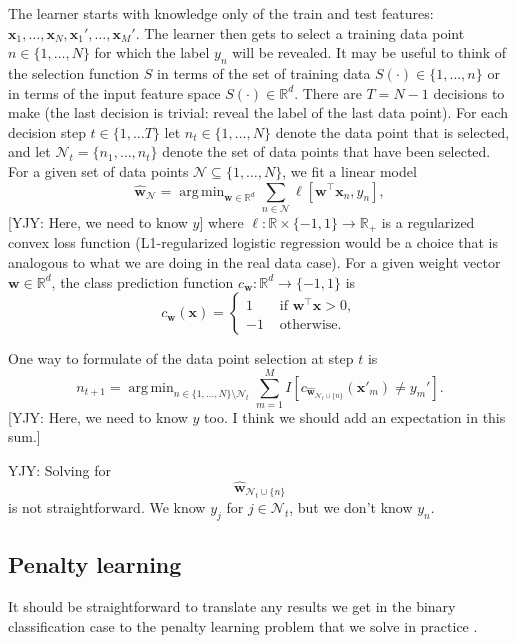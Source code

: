 \documentclass{article}
\newcommand{\RR}{\mathbb R}
\DeclareMathOperator*{\argmin}{arg\,min}
\begin{document}
The learner starts with knowledge only of the train and test features:
$\mathbf x_1, \dots, \mathbf x_N, \mathbf x_1', \dots, \mathbf
x_M'$. The learner then gets to select a training data point $n\in\{1,
\dots, N\}$ for which the label $y_n$ will be revealed. It may be
useful to think of the selection function $S$ in terms of the set of
training data $S(\cdot)\in\{1,\dots, n\}$ or in terms of the input
feature space $S(\cdot)\in\RR^d$. There are $T= N-1$ decisions to make
(the last decision is trivial: reveal the label of the last data
point). For each decision step $t\in\{1, \dots T\}$ let
$n_t\in\{1,\dots, N\}$ denote the data point that is selected, and let
$\mathcal N_t=\{n_1, \dots, n_t\}$ denote the set of data points that
have been selected. For a given set of data points $\mathcal
N\subseteq \{1, \dots, N\}$, we fit a linear model
\begin{equation}
  \label{eq:argmin_w}
  \mathbf{\hat w}_{\mathcal N} = 
  \argmin_{\mathbf w \in \RR^d} 
  \sum_{n\in\mathcal N} \ell\left[
    \mathbf w^\intercal \mathbf x_n, y_n
  \right],
\end{equation}
[YJY: Here, we need to know $y$]
where $\ell:\RR \times \{-1, 1\}\rightarrow \RR_+$ is a regularized
convex loss function (L1-regularized logistic regression would be a
choice that is analogous to what we are doing in the real data case).
For a given weight vector $\mathbf w\in\RR^d$, the class prediction
function $c_{\mathbf w}:\RR^d\rightarrow\{-1, 1\}$ is
\begin{equation}
  \label{eq:c_w}
  c_{\mathbf w}(\mathbf x) =
  \begin{cases}
    1 & \text{ if } \mathbf w^\intercal \mathbf x > 0, \\
    -1 & \text{ otherwise.}
  \end{cases}
\end{equation}

One way to formulate of the data point selection at step $t$ is 
\begin{equation}
  \label{eq:argmin_n_t}
  n_{t+1} =
  \argmin_{n\in\{1,\dots,N\} \setminus \mathcal N_t}
  \sum_{m=1}^M
  I\left[
    c_{\mathbf{\hat w}_{\mathcal N_t \cup \{n\}}}(\mathbf x'_m) \neq y_m'
  \right].
\end{equation}
[YJY: Here, we need to know $y$ too. I think we should add an expectation in this sum.]

YJY: Solving for 
\begin{equation}
  \mathbf{\hat w}_{\mathcal N_t \cup \{n\}}
\end{equation}
is not straightforward. We know $y_j$ for $j \in \mathcal N_t$, but we don't know $y_n$.


\subsection{Penalty learning}

It should be straightforward to translate any results we get in the
binary classification case to the penalty learning problem that we
solve in practice \citep{HOCKING-penalties}.




\end{document}
